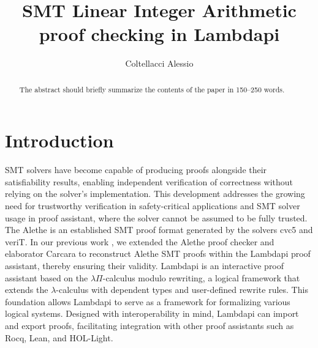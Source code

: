 \documentclass[runningheads]{llncs}
\begin{document}
\title{SMT Linear Integer Arithmetic proof checking in Lambdapi}


\author{Coltellacci Alessio
}
%
%

%
\maketitle
%
\begin{abstract}
The abstract should briefly summarize the contents of the paper in
150--250 words.

\end{abstract}

\section{Introduction}

SMT solvers have become capable of producing proofs alongside their satisfiability results,  enabling independent verification of correctness without relying on the solver's implementation.
This development addresses the growing need for trustworthy verification in safety-critical applications and SMT solver usage in proof assistant, where the solver cannot be assumed to be fully trusted.
The Alethe \cite{alethe,alethespec} is an established SMT proof format generated by the solvers cvc5 and veriT. In our previous work \cite{ColtellacciMD24}, we extended the Alethe proof checker and elaborator Carcara \cite{carcara} to
reconstruct Alethe SMT proofs within the Lambdapi proof assistant, thereby ensuring their validity.
Lambdapi is an interactive proof assistant based on the $\lambda\Pi$-calculus modulo rewriting, a logical framework that extends the $\lambda$-calculus with dependent types and user-defined rewrite rules.
This foundation allows Lambdapi to serve as a framework for formalizing various logical systems.
Designed with interoperability in mind, Lambdapi can import and export proofs, facilitating integration with other proof assistants such as Rocq, Lean, and HOL-Light. 
\end{document}
